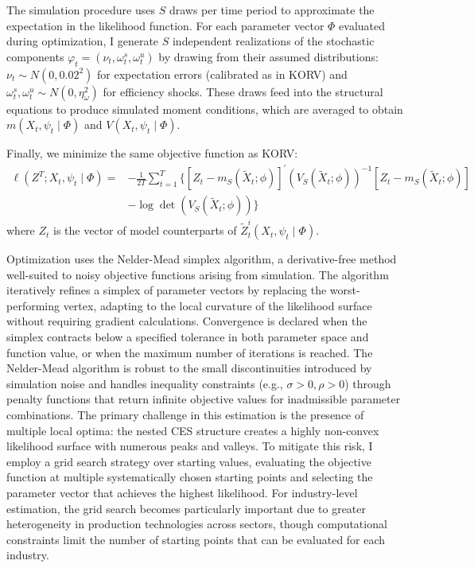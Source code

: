 \documentclass[12pt]{article}
\begin{document}
The simulation procedure uses $S$ draws per time period to approximate the expectation in the likelihood function. For each parameter vector $\Phi$ evaluated during optimization, I generate $S$ independent realizations of the stochastic components $\varphi_t = (\nu_t, \omega^s_t, \omega^u_t)$ by drawing from their assumed distributions: $\nu_t \sim N(0, 0.02^2)$ for expectation errors (calibrated as in KORV) and $\omega^s_t, \omega^u_t \sim N(0, \eta_\omega^2)$ for efficiency shocks. These draws feed into the structural equations to produce simulated moment conditions, which are averaged to obtain $m(X_t, \psi_t \mid \Phi)$ and $V(X_t, \psi_t \mid \Phi)$.

Finally, we minimize the same objective function as KORV:
\begin{equation}\label{eq:objective_funct_estimation}
 \begin{aligned}
 \ell(Z^{T} ; X_{t}, \psi_{t} \mid \Phi)=&-\frac{1}{2 T} \sum_{t=1}^{T}\bigl\{[Z_{t}-m_{S}(\tilde{X}_{t} ; \phi)]^{\prime}(V_{S}(\tilde{X}_{t} ; \phi))^{-1}[Z_{t}-m_{S}(\tilde{X}_{t} ; \phi)]\\
 &-\log \operatorname{det}(V_{S}(\tilde{X}_{t} ; \phi))\bigr\}
 \end{aligned} 
\end{equation}
where $Z_{t}$ is the vector of model counterparts of $\tilde{Z}^{i}_t(X_{t}, \psi_{t} \mid \Phi)$.

Optimization uses the Nelder-Mead simplex algorithm, a derivative-free method well-suited to noisy objective functions arising from simulation. The algorithm iteratively refines a simplex of parameter vectors by replacing the worst-performing vertex, adapting to the local curvature of the likelihood surface without requiring gradient calculations. Convergence is declared when the simplex contracts below a specified tolerance in both parameter space and function value, or when the maximum number of iterations is reached. The Nelder-Mead algorithm is robust to the small discontinuities introduced by simulation noise and handles inequality constraints (e.g., $\sigma > 0, \rho > 0$) through penalty functions that return infinite objective values for inadmissible parameter combinations. The primary challenge in this estimation is the presence of multiple local optima: the nested CES structure creates a highly non-convex likelihood surface with numerous peaks and valleys. To mitigate this risk, I employ a grid search strategy over starting values, evaluating the objective function at multiple systematically chosen starting points and selecting the parameter vector that achieves the highest likelihood. For industry-level estimation, the grid search becomes particularly important due to greater heterogeneity in production technologies across sectors, though computational constraints limit the number of starting points that can be evaluated for each industry.
\end{document}
